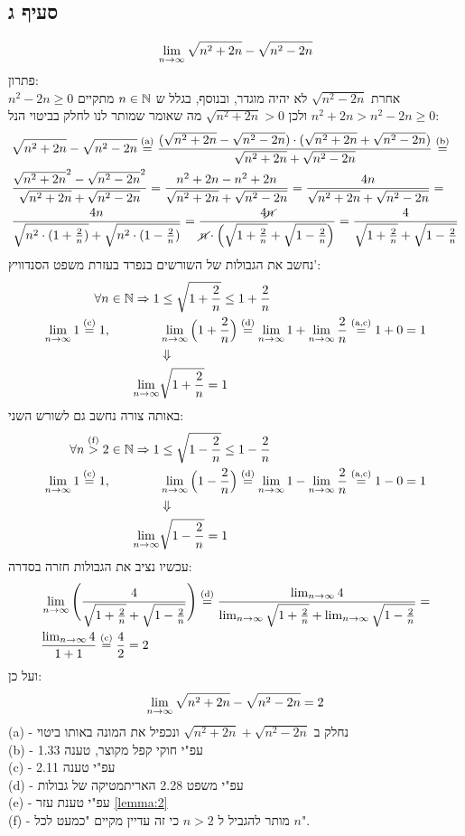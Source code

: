 \documentclass{article}
\begin{document}
\subsection*{סעיף ג}
\[ \lim_{n \to \infty} \sqrt{n^2 + 2n} - \sqrt{n^2 - 2n} \]
פתרון: \\
$n^2 - 2n \geq 0$ אחרת $\sqrt{n^2 - 2n}$ לא יהיה מוגדר,
 ובנוסף, בגלל ש $n \in \mathbb{N}$ מתקיים $n^2 + 2n > n^2 - 2n \geq 0$ ולכן
 $\sqrt{n^2 + 2n} > 0$
 מה שאומר שמותר לנו לחלק בביטוי הנל:
 \begin{align*}
	&\sqrt{n^2 + 2n} - \sqrt{n^2 - 2n} \overset{\text{(a)}}=
	\frac{(\sqrt{n^2 + 2n} - \sqrt{n^2 - 2n}) \cdot (\sqrt{n^2 + 2n} + \sqrt{n^2 - 2n})}{\sqrt{n^2 + 2n} + \sqrt{n^2 - 2n}} \overset{\text{(b)}} = \\
	&\frac{\sqrt{n^2 + 2n}^2 - \sqrt{n^2 - 2n}^2}{\sqrt{n^2 + 2n} + \sqrt{n^2 - 2n}} =
	\frac{n^2 + 2n - n^2 + 2n}{\sqrt{n^2 + 2n} + \sqrt{n^2 - 2n}} =
	\frac{4n}{\sqrt{n^2 + 2n} + \sqrt{n^2 - 2n}} = \\
	&\frac{4n}{\sqrt{n^2 \cdot (1 + \frac{2}{n})} + \sqrt{n^2 \cdot ( 1 - \frac{2}{n} )}} =
	\frac{4\cancel{n}}{\cancel{n} \cdot \Big(\sqrt{1 + \frac{2}{n}} + \sqrt{1 - \frac{2}{n}} \Big)} =
	\frac{4}{\sqrt{1 + \frac{2}{n}} + \sqrt{1 - \frac{2}{n}}}
 \end{align*}
נחשב את הגבולות של השורשים בנפרד בעזרת משפט הסנדוויץ':
\begin{align*}
	\forall n \in \mathbb{N} \Rightarrow 1 &\leq \sqrt{1 + \frac{2}{n}} \leq 1 +  \frac{2}{n} \\
	\lim_{n \to \infty} 1 \overset{\text{(c)}}= 1, \qquad \qquad
	&\lim_{n \to \infty} \Big(1 + \frac{2}{n} \Big) \overset{\text{(d)}}=
	\lim_{n \to \infty} 1 + \lim_{n \to \infty} \frac{2}{n} \overset{\text{(a,c)}}=
	1 + 0 = 1 \\
	&\Downarrow \\
	\lim_{n \to \infty} &\sqrt{1 + \frac{2}{n}} = 1
\end{align*}
באותה צורה נחשב גם לשורש השני:
\begin{align*}
	\forall n \overset{\text{(f)}}> 2 \in \mathbb{N} \Rightarrow 1 &\leq \sqrt{1 - \frac{2}{n}} \leq 1 -  \frac{2}{n} \\
	\lim_{n \to \infty} 1 \overset{\text{(c)}}= 1, \qquad \qquad
	&\lim_{n \to \infty} \Big(1 - \frac{2}{n} \Big) \overset{\text{(d)}}=
	\lim_{n \to \infty} 1 - \lim_{n \to \infty} \frac{2}{n} \overset{\text{(a,c)}}=
	1 - 0 = 1 \\
	&\Downarrow \\
	\lim_{n \to \infty} &\sqrt{1 - \frac{2}{n}} = 1
\end{align*}
עכשיו נציב את הגבולות חזרה בסדרה:
\begin{align*}
	&\lim_{n \to \infty} \Bigg(\frac{4}{\sqrt{1 + \frac{2}{n}} + \sqrt{1 - \frac{2}{n}}} \Bigg) \overset{\text{(d)}}=
	\frac{\lim_{n \to \infty}4}{\lim_{n \to \infty}\sqrt{1 + \frac{2}{n}} + \lim_{n \to \infty}\sqrt{1 - \frac{2}{n}}} = \\
	&\frac{\lim_{n \to \infty}4}{1 + 1} \overset{\text{(c)}}=
	\frac{4}{2} = 2
 \end{align*}
 ועל כן:
 \[ \lim_{n \to \infty} \sqrt{n^2 + 2n} - \sqrt{n^2 - 2n} = 2 \]
(a) -
נחלק ב $\sqrt{n^2 + 2n} + \sqrt{n^2 - 2n}$ ונכפיל את המונה באותו ביטוי\\
(b) -
עפ"י חוקי קפל מקוצר, טענה 1.33\\
(c) -
עפ"י טענה 2.11\\
(d) -
עפ"י משפט 2.28 האריתמטיקה של גבולות \\
(e) -
עפ"י טענת עזר \ref{lemma:2} \\
(f) -
מותר להגביל ל $n > 2$ כי זה עדיין מקיים "כמעט לכל $n$".
\end{document}
